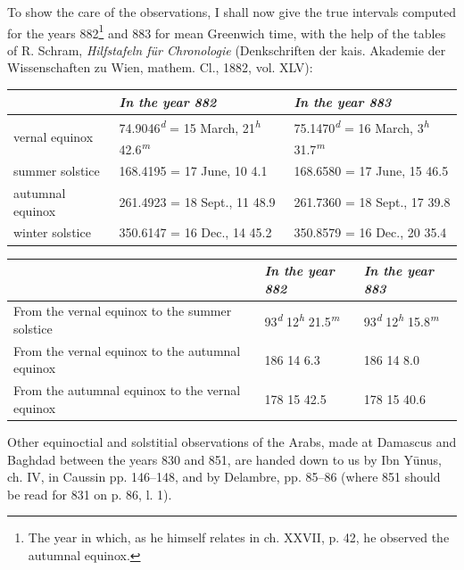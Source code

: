 \documentclass[11pt]{article}
\newcommand{\Pg}[1]{\marginpar{\footnotesize\color{gray}#1}}
\begin{document}
\par To show the care of the observations, I shall now give the true intervals computed for the years 882\footnote{The year in which, as he himself relates in ch. XXVII, p. 42, he observed the autumnal equinox.} and 883 for mean Greenwich time, with the help of the tables of R. Schram, \emph{Hilfstafeln für Chronologie} (Denkschriften der kais. Akademie der Wissenschaften zu Wien, mathem. Cl., 1882, vol. XLV):\par
\begin{center}\small\begin{tabular}{lll}
 & \emph{In the year 882} & \emph{In the year 883} \\
\midrule
vernal equinox & 74.9046\textsuperscript{\itshape d} = 15 March, 21\textsuperscript{\itshape h} 42.6\textsuperscript{\itshape m} & 75.1470\textsuperscript{\itshape d} = 16 March, 3\textsuperscript{\itshape h} 31.7\textsuperscript{\itshape m} \\
summer solstice & 168.4195 = 17 June, 10 4.1 & 168.6580 = 17 June, 15 46.5 \\
autumnal equinox & 261.4923 = 18 Sept., 11 48.9 & 261.7360 = 18 Sept., 17 39.8 \\
winter solstice & 350.6147 = 16 Dec., 14 45.2 & 350.8579 = 16 Dec., 20 35.4 \\
\end{tabular}\end{center}
\Pg{I 213}\begin{center}\small\begin{tabular}{lll}
 & \emph{In the year 882} & \emph{In the year 883} \\
\midrule
From the vernal equinox to the summer solstice & 93\textsuperscript{\itshape d} 12\textsuperscript{\itshape h} 21.5\textsuperscript{\itshape m} & 93\textsuperscript{\itshape d} 12\textsuperscript{\itshape h} 15.8\textsuperscript{\itshape m} \\
From the vernal equinox to the autumnal equinox & 186 14 6.3 & 186 14 8.0 \\
From the autumnal equinox to the vernal equinox & 178 15 42.5 & 178 15 40.6 \\
\end{tabular}\end{center}
\par Other equinoctial and solstitial observations of the Arabs, made at Damascus and Baghdad between the years 830 and 851, are handed down to us by Ibn Yūnus, ch. IV, in Caussin pp. 146–148, and by Delambre, pp. 85–86 (where 851 should be read for 831 on p. 86, l. 1).\par
\end{document}
